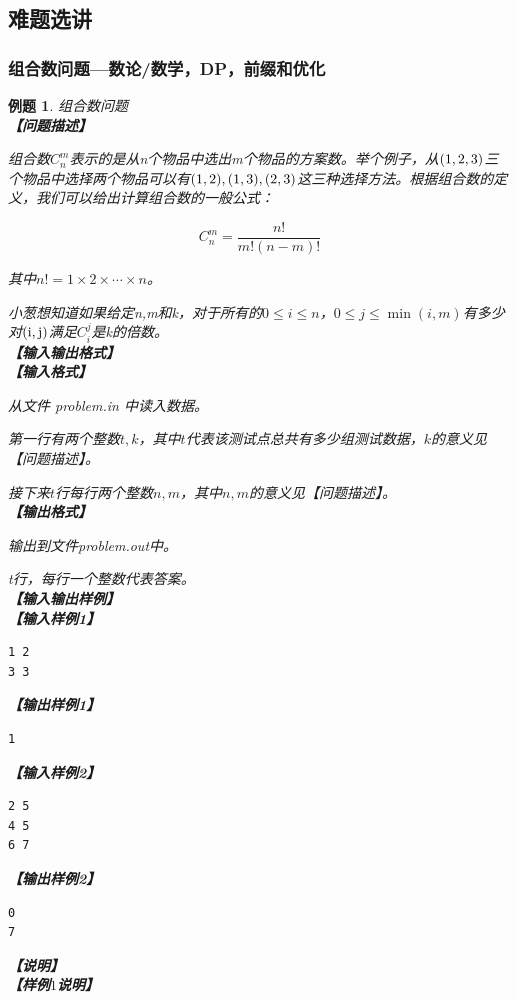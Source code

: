 \documentclass{article}
\newtheorem{example}{例题}[subsection]
\theoremstyle{nonumberplain}
\begin{document}
	\newpage
	\subsection{难题选讲}
	\subsubsection{组合数问题---数论/数学，DP，前缀和优化}
	\begin{example} 组合数问题\\
		\textbf{【问题描述】}

		组合数$C_n^m$表示的是从n个物品中选出m个物品的方案数。举个例子，从$\rm (1,2,3)$三个物品中选择两个物品可以有$\rm (1,2),(1,3),(2,3)$这三种选择方法。根据组合数的定义，我们可以给出计算组合数的一般公式：

		\begin{equation*}C_n^m=\frac{n!}{m!(n - m)!}\end{equation*}

		其中$n!=1\times 2\times\cdots\times n$。

		小葱想知道如果给定n,m和k，对于所有的$0\leq i\leq n$，$0\leq j\leq\min(i,m)$有多少对$\rm (i,j)$满足$C_i^j$是k的倍数。\\
		\textbf{【输入输出格式】}\\
		\textbf{【输入格式】}

		从文件 problem.in 中读入数据。

		第一行有两个整数$t,k$，其中$t$代表该测试点总共有多少组测试数据，$k$的意义见 【问题描述】。

		接下来$t$行每行两个整数$n, m$，其中$n, m$的意义见【问题描述】。 \\
		\textbf{【输出格式】}

		输出到文件problem.out中。

		t行，每行一个整数代表答案。\\
		\textbf{【输入输出样例】}\\
		\textbf{【输入样例1】}
		\begin{verbatim}
1 2
3 3
\end{verbatim}
		\textbf{【输出样例1】}
		\begin{verbatim}
1
\end{verbatim}
		\textbf{【输入样例2】}
		\begin{verbatim}
2 5
4 5
6 7
\end{verbatim}
		\textbf{【输出样例2】}
		\begin{verbatim}
0
7
\end{verbatim}
		\textbf{【说明】}\\
		\textbf{【样例$1$说明】}


\end{example}
\end{document}
